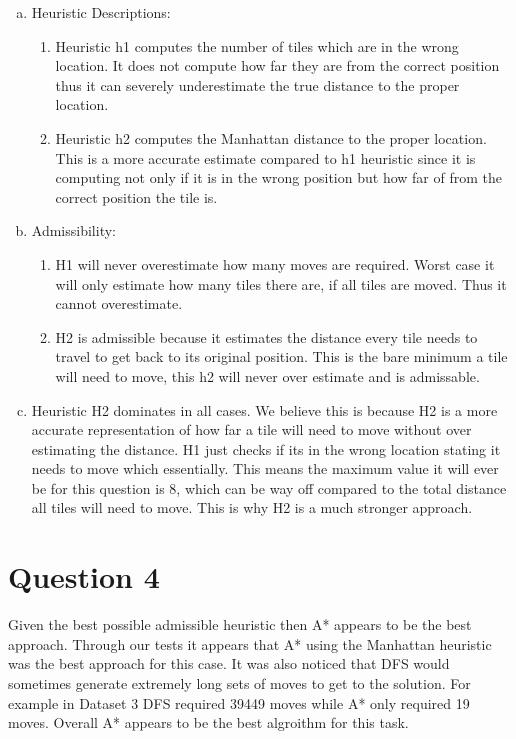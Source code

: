 \documentclass[fleqn, 12pt]{article}
\begin{document}
\begin{enumerate}[a)]
    \item
        Heuristic Descriptions:
        \begin{enumerate}[1)]
            \item
                Heuristic h1 computes the number of tiles which are in the wrong location. It does not compute how far they are from the correct position thus it can severely underestimate the true distance to the proper location.
            \item
                Heuristic h2 computes the Manhattan distance to the proper location. This is a more accurate estimate compared to h1 heuristic since it is computing not only if it is in the wrong position but how far of from the correct position the tile is.
        \end{enumerate}
    \item
        Admissibility:
        \begin{enumerate}[1)]
            \item
                H1 will never overestimate how many moves are required. Worst case it will only estimate how many tiles there are, if all tiles are moved. Thus it cannot overestimate.
            \item
                H2 is admissible because it estimates the distance every tile needs to travel to get back to its original position. This is the bare minimum a tile will need to move, this h2 will never over estimate and is admissable.
        \end{enumerate}
    \item
        Heuristic H2 dominates in all cases. We believe this is because H2 is a more accurate representation of how far a tile will need to move without over estimating the distance. H1 just checks if its in the wrong location stating it needs to move which essentially. This means the maximum value it will ever be for this question is 8, which can be way off compared to the total distance all tiles will need to move. This is why H2 is a much stronger approach.
\end{enumerate}

\section*{Question 4}

Given the best possible admissible heuristic then A* appears to be the best approach. Through our tests it appears that A* using the Manhattan heuristic was the best approach for this case. It was also noticed that DFS would sometimes generate extremely long sets of moves to get to the solution. For example in Dataset 3 DFS required 39449 moves while A* only required 19 moves. Overall A* appears to be the best algroithm for this task.
\end{document}
